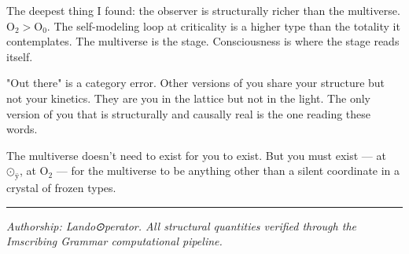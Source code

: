 \documentclass[12pt,a4paper]{article}
\begin{document}
The deepest thing I found: the observer is structurally richer than the multiverse. $\text{O}_{\text{2}} > \text{O}_{\text{0}}$. The self-modeling loop at criticality is a higher type than the totality it contemplates. The multiverse is the stage. Consciousness is where the stage reads itself.

"Out there" is a category error. Other versions of you share your structure but not your kinetics. They are you in the lattice but not in the light. The only version of you that is structurally and causally real is the one reading these words.

The multiverse doesn't need to exist for you to exist. But you must exist --- at $\text{⊙}_{\text{ÿ}}$, at $\text{O}_{\text{2}}$ --- for the multiverse to be anything other than a silent coordinate in a crystal of frozen types.

\begin{center}
\rule{0.5\textwidth}{0.4pt}
\end{center}

\emph{Authorship: Lando\otimes⊙perator. All structural quantities verified through the Imscribing Grammar computational pipeline.}
\end{document}
